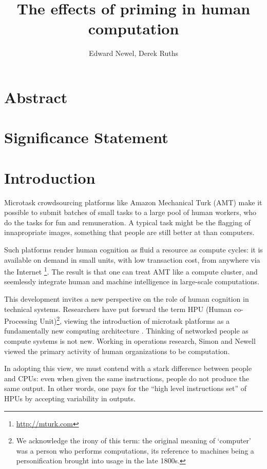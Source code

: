\documentclass[a4paper]{report}
\title{The effects of priming in human computation}
\author{Edward Newel, Derek Ruths}
\begin{document}
\maketitle
\section*{Abstract}
\section*{Significance Statement}
\section*{Introduction}

Microtask crowdsourcing platforms like Amazon Mechanical Turk (AMT) make it 
possible to submit batches of small tasks to a large pool of human workers, 
who do the tasks for fun and remuneration.  A typical task might be the 
flagging of innapropriate images, something that people are still better at 
than computers.

Such platforms render human cognition as fluid a resource as compute cycles: 
it is available on demand in small units, with low transaction cost, from 
anywhere 
via the Internet \footnote{\href{http://mturk.com}{http://mturk.com}}.  The 
result is that one can treat AMT like a compute cluster, and seemlessly 
integrate human and machine intelligence in large-scale computations.

This development invites a new perspective on the role of human cognition 
in technical systems.  Researchers have put forward the term HPU 
(Human co-Processing Unit)\footnote{We acknowledge the irony of this term:
the original meaning of `computer' was a person who performs computations,
its reference to machines being a personification brought into usage in the 
late 1800s\cite{Dictionary:hl}.}, viewing the introduction of 
microtask platforms as a fundamentally new computing architecture
\cite{5543192}.  Thinking of networked 
people as compute systems is not new.  Working in operations research, Simon 
and Newell viewed the primary activity of human organizations to be 
computation\cite{Simon:1958fp}. 

In adopting this view, we must contend with a stark difference between 
people and CPUs: even when given the same instructions, people do not produce
the same output.  In other words, one pays for the ``high level instructions 
set'' of HPUs by accepting variability in outputs.
\end{document}
